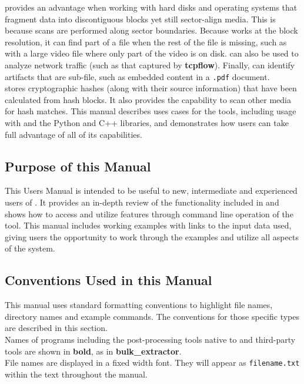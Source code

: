 \documentclass[11pt,fleqn]{article} %
\begin{document}
\hdb provides an advantage when working with hard disks and operating systems that fragment data into discontiguous blocks yet still sector-align media. This is because scans are performed along sector boundaries. Because \hdb works at the block resolution, it can find part of a file when the rest of the file is missing, such as with a large video file where only part of the video is on disk. \hdb can also be used to analyze network traffic (such as that captured by \textbf{tcpflow}).  Finally, \hdb can identify artifacts that are sub-file, such as embedded content in a \texttt{.pdf} document.\\

\hdb stores cryptographic hashes (along with their source information) that have been calculated from hash blocks. It also provides the capability to scan other media for hash matches.
This manual describes uses cases for the \hdb tools, including usage with \bulk and the \hdb Python and C++ libraries, and demonstrates how users can take full advantage of all of its capabilities.

\subsection{Purpose of this Manual}
This Users Manual is intended to be useful to new, intermediate and experienced users of \hdb. It provides an in-depth review of the functionality included in \hdb and shows how to access and utilize features through command line operation of the tool. This manual includes working examples with links to the input data used, giving users the opportunity to work through the examples and utilize all aspects of the system. 

\subsection{Conventions Used in this Manual}
This manual uses standard formatting conventions to highlight file names, directory names and example commands. The conventions for those specific types are described in this section. \\

Names of programs including the post-processing tools native to \hdb and third-party tools are shown in \textbf{bold}, as in \textbf{bulk\_extractor}.\\

File names are displayed in a fixed width font. They will appear as \texttt{filename.txt} within the text throughout the manual.\\
\end{document}

